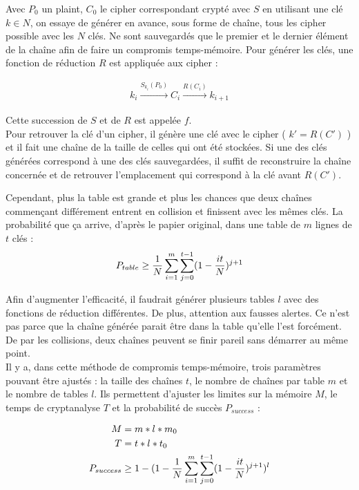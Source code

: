 
	Avec $P_0$ un \gls{plaint}, $C_0$ le \gls{cipher} correspondant crypté avec $S$ en utilisant une clé $k \in N$, on essaye de générer en avance, sous forme de chaîne, tous les \gls{cipher} possible avec les $N$ clés. Ne sont sauvegardés que le premier et le dernier élément de la chaîne afin de faire un compromis temps-mémoire. Pour générer les clés, une fonction de réduction $R$ est appliquée aux \gls{cipher} :

	\begin{align*}
		k_i \overset{S_{k_i}(P_0)}{\longrightarrow} C_i \overset{R(C_i)}{\longrightarrow} k_{i+1}
	\end{align*}

	Cette succession de $S$ et de $R$ est appelée $f$.\\

	Pour retrouver la clé d'un \gls{cipher}, il génère une clé avec le \gls{cipher} ( $k' = R(C')$ ) et il fait une chaîne de la taille de celles qui ont été stockées. Si une des clés générées correspond à une des clés sauvegardées, il suffit de reconstruire la chaîne concernée et de retrouver l'emplacement qui correspond à la clé avant $R(C')$.

	Cependant, plus la table est grande et plus les chances que deux chaînes commençant différement entrent en collision et finissent avec les mêmes clés. La probabilité que ça arrive, d'après le papier original\cite{ehellman}, dans une table de $m$ lignes de $t$ clés :\\

	\begin{align*}
		P_{table} \ge{} \frac{1}{N} \sum\limits_{i=1}^{m}\sum\limits_{j=0}^{t-1} (1 - \frac{it}{N})^{j+1}
	\end{align*}

	Afin d'augmenter l'efficacité, il faudrait générer plusieurs tables $l$ avec des fonctions de réduction différentes. De plus, attention aux fausses alertes. Ce n'est pas parce que la chaîne générée parait être dans la table qu'elle l'est forcément. De par les collisions, deux chaînes peuvent se finir pareil sans démarrer au même point.\\

	Il y a, dans cette méthode de compromis temps-mémoire, trois paramètres pouvant être ajustés : la taille des chaînes $t$, le nombre de chaînes par table $m$ et le nombre de tables $l$. Ils permettent d'ajuster les limites sur la mémoire $M$, le temps de cryptanalyse $T$ et la probabilité de succès $P_{success}$\cite{Oech03} :

	\begin{align*}
		M &= m*l*m_0\\
		T &= t*l*t_0\\
		P_{success} &\ge{} 1 - (1 - \frac{1}{N} \sum\limits_{i=1}^{m}\sum\limits_{j=0}^{t-1} (1 - \frac{it}{N})^{j+1})^l
	\end{align*}

\endinput{}
